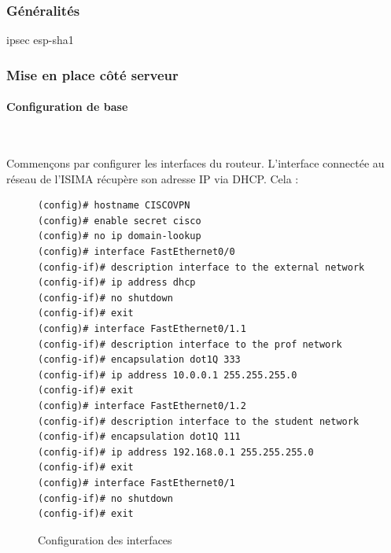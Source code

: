 \subsubsection{Généralités}
ipsec esp-sha1

\subsubsection{Mise en place côté serveur}

\paragraph{Configuration de base}
~

Commençons par configurer les interfaces du routeur. L'interface connectée au réseau de l'ISIMA récupère son adresse IP via DHCP. Cela :
\begin{figure}[H]
	\begin{center}
		\begin{minipage}{0.90\textwidth}
			\begin{lstlisting}[frame=trBL]
(config)# hostname CISCOVPN
(config)# enable secret cisco
(config)# no ip domain-lookup
(config)# interface FastEthernet0/0
(config-if)# description interface to the external network
(config-if)# ip address dhcp
(config-if)# no shutdown
(config-if)# exit
(config)# interface FastEthernet0/1.1
(config-if)# description interface to the prof network
(config-if)# encapsulation dot1Q 333
(config-if)# ip address 10.0.0.1 255.255.255.0
(config-if)# exit
(config)# interface FastEthernet0/1.2
(config-if)# description interface to the student network
(config-if)# encapsulation dot1Q 111
(config-if)# ip address 192.168.0.1 255.255.255.0
(config-if)# exit
(config)# interface FastEthernet0/1
(config-if)# no shutdown
(config-if)# exit
			\end{lstlisting}
		\end{minipage}
	\end{center}
	\caption{Configuration des interfaces}
	\label{configuration_interfaces}
\end{figure}

~

